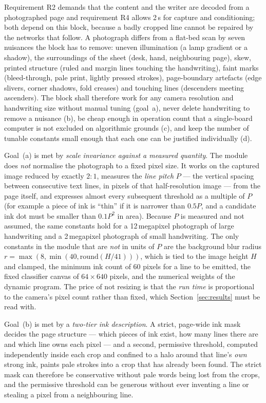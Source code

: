 Requirement R2 demands that the content and the writer are decoded from a photographed page and requirement R4 allows 2\,s for capture and conditioning; both depend on this block, because a badly cropped line cannot be repaired by the networks that follow.
A photograph differs from a flat-bed scan by seven nuisances the block has to remove: uneven illumination (a lamp gradient or a shadow), the surroundings of the sheet (desk, hand, neighbouring page), skew, printed structure (ruled and margin lines touching the handwriting), faint marks (bleed-through, pale print, lightly pressed strokes), page-boundary artefacts (edge slivers, corner shadows, fold creases) and touching lines (descenders meeting ascenders).
The block shall therefore work for any camera resolution and handwriting size without manual tuning (goal~a), never delete handwriting to remove a nuisance (b), be cheap enough in operation count that a single-board computer is not excluded on algorithmic grounds (c), and keep the number of tunable constants small enough that each one can be justified individually (d).

Goal~(a) is met by \emph{scale invariance against a measured quantity}.
The module does \emph{not} normalise the photograph to a fixed pixel size.
It works on the captured image reduced by exactly $2{:}1$, measures the \emph{line pitch} $P$ --- the vertical spacing between consecutive text lines, in pixels of that half-resolution image --- from the page itself, and expresses almost every subsequent threshold as a multiple of $P$ (for example a piece of ink is ``thin'' if it is narrower than $0.5P$, and a candidate ink dot must be smaller than $0.1P^2$ in area).
Because $P$ is measured and not assumed, the same constants hold for a 12\,megapixel photograph of large handwriting and a 2\,megapixel photograph of small handwriting.
The only constants in the module that are \emph{not} in units of $P$ are the background blur radius $r=\max(8,\min(40,\mathrm{round}(H/41)))$, which is tied to the image height $H$ and clamped, the minimum ink count of 60 pixels for a line to be emitted, the fixed classifier canvas of $64\times640$ pixels, and the numerical weights of the dynamic program.
The price of not resizing is that the \emph{run time} is proportional to the camera's pixel count rather than fixed, which Section~\ref{sec:results} must be read with.

Goal~(b) is met by a \emph{two-tier ink description}.
A strict, page-wide ink mask decides the page structure --- which pieces of ink exist, how many lines there are and which line owns each pixel --- and a second, permissive threshold, computed independently inside each crop and confined to a halo around that line's \emph{own} strong ink, paints pale strokes into a crop that has already been found.
The strict mask can therefore be conservative without pale words being lost from the crops, and the permissive threshold can be generous without ever inventing a line or stealing a pixel from a neighbouring line.

